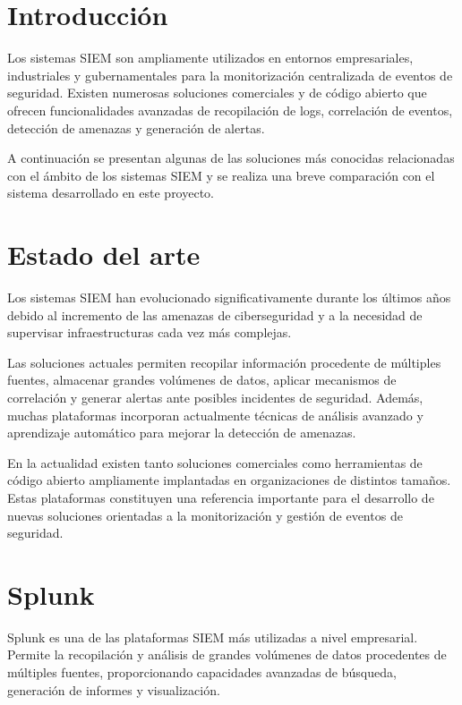 
\section{Introducción}

Los sistemas SIEM son ampliamente utilizados en entornos empresariales, industriales y gubernamentales para la monitorización centralizada de eventos de seguridad. Existen numerosas soluciones comerciales y de código abierto que ofrecen funcionalidades avanzadas de recopilación de logs, correlación de eventos, detección de amenazas y generación de alertas.

A continuación se presentan algunas de las soluciones más conocidas relacionadas con el ámbito de los sistemas SIEM y se realiza una breve comparación con el sistema desarrollado en este proyecto.

\section{Estado del arte}

Los sistemas SIEM han evolucionado significativamente durante los últimos años debido al incremento de las amenazas de ciberseguridad y a la necesidad de supervisar infraestructuras cada vez más complejas.

Las soluciones actuales permiten recopilar información procedente de múltiples fuentes, almacenar grandes volúmenes de datos, aplicar mecanismos de correlación y generar alertas ante posibles incidentes de seguridad. Además, muchas plataformas incorporan actualmente técnicas de análisis avanzado y aprendizaje automático para mejorar la detección de amenazas.

En la actualidad existen tanto soluciones comerciales como herramientas de código abierto ampliamente implantadas en organizaciones de distintos tamaños. Estas plataformas constituyen una referencia importante para el desarrollo de nuevas soluciones orientadas a la monitorización y gestión de eventos de seguridad.

\section{Splunk}

Splunk \cite{splunk} es una de las plataformas SIEM más utilizadas a nivel empresarial. Permite la recopilación y análisis de grandes volúmenes de datos procedentes de múltiples fuentes, proporcionando capacidades avanzadas de búsqueda, generación de informes y visualización.

